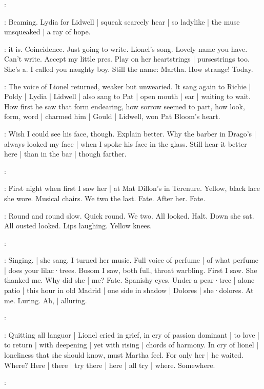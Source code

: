 \simon:

:
Beaming.
Lydia for Lidwell |
squeak scarcely hear |
so ladylike |
the muse unsqueaked |
a ray of hope.

\BloomIntA:
 it is.
Coincidence.
Just going to write.
Lionel's song.
Lovely name you have.
Can't write.
Accept my little pres.
Play on her heartstrings |
pursestrings too.
She's a.
I called you naughty boy.
Still the name:
Martha.
How strange!
Today.

:
The voice of Lionel returned,
weaker but unwearied.
It sang again to Richie |
Poldy |
Lydia |
Lidwell |
also sang to Pat |
open mouth |
ear |
waiting to wait.
How first he saw that form endearing,
how sorrow seemed to part,
how look,
form,
word |
charmed him |
Gould |
Lidwell,
won Pat Bloom's heart.

\BloomIntA:
Wish I could see his face,
though.
Explain better.
Why the barber in Drago's |
always looked my face |
when I spoke his face in the glass.
Still hear it better here |
than in the bar |
though farther.

\simon:

\BloomIntB:
First night when first I saw her |
at Mat Dillon's in Terenure.
Yellow,
black lace she wore.
Musical chairs.
We two the last.
Fate.
After her.
Fate.

\BloomIntB:
Round and round slow.
Quick round.
We two.
All looked.
Halt.
Down she
sat.
All ousted looked.
Lips laughing.
Yellow knees.

\simon:

\BloomIntB:
Singing.
 |
she sang.
I turned her music.
Full voice of perfume |
of what perfume |
does your lilac·trees.
Bosom I saw,
both full,
throat warbling.
First I saw.
She thanked me.
Why did she |
me?
Fate.
Spanishy eyes.
Under a pear·tree |
alone patio |
this hour in old Madrid |
one side in shadow |
Dolores |
she·dolores.
At me.
Luring.
Ah, |
alluring.

\simon:

:
Quitting all languor |
Lionel cried in grief,
in cry of passion dominant |
to love |
to return |
with deepening |
yet with rising |
chords of harmony.
In cry of lionel |
loneliness that she should know,
must Martha feel.
For only her |
he waited.
Where?
Here |
there |
try there |
here |
all try |
where.
Somewhere.

\simon:

